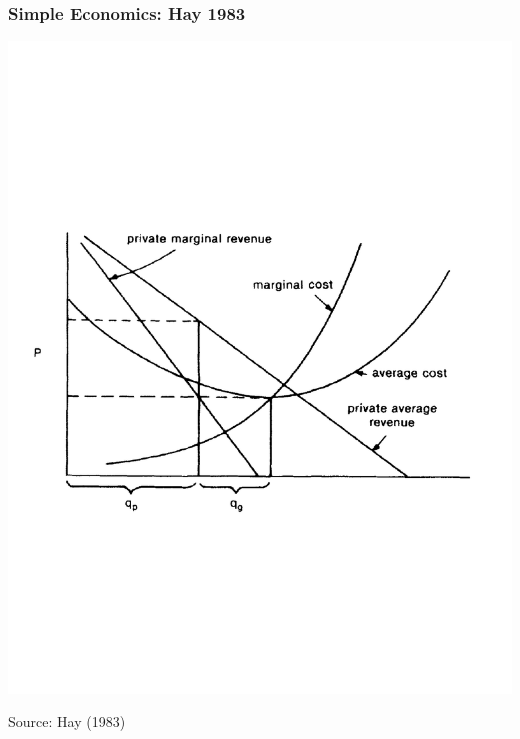\documentclass[ucs,9pt]{beamer}
\begin{document}
\begin{frame}
\frametitle{Simple Economics: Hay 1983}
\begin{center}
\includegraphics[scale=0.5]{hay}
\end{center}
\tiny Source: Hay (1983)
\end{frame}






\end{document}
